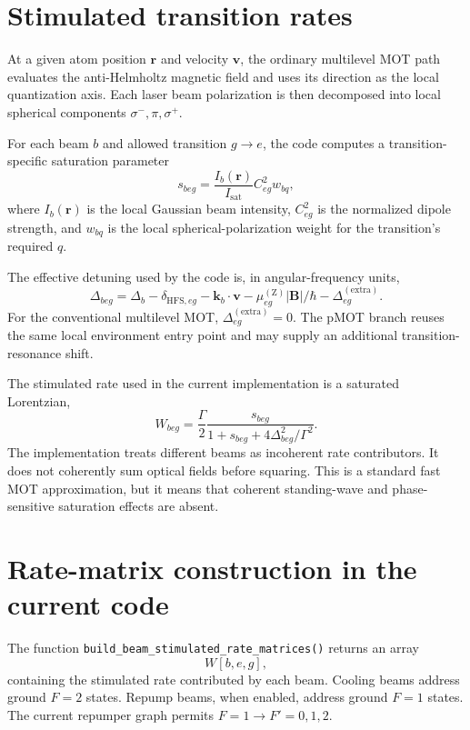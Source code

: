 \documentclass[11pt]{article}
\begin{document}
\section{Stimulated transition rates}

At a given atom position \(\mathbf r\) and velocity \(\mathbf v\), the ordinary
multilevel MOT path evaluates the anti-Helmholtz magnetic field and uses its
direction as the local quantization axis.  Each laser beam polarization is then
decomposed into local spherical components \(\sigma^{-},\pi,\sigma^{+}\).

For each beam \(b\) and allowed transition \(g\rightarrow e\), the code computes
a transition-specific saturation parameter
\[
    s_{b e g}
    =
    \frac{I_b(\mathbf r)}{I_{\mathrm{sat}}}
    C_{eg}^{2}
    w_{bq},
\]
where \(I_b(\mathbf r)\) is the local Gaussian beam intensity,
\(C_{eg}^{2}\) is the normalized dipole strength, and \(w_{bq}\) is the local
spherical-polarization weight for the transition's required \(q\).

The effective detuning used by the code is, in angular-frequency units,
\[
    \Delta_{b e g}
    =
    \Delta_b
    - \delta_{\mathrm{HFS},eg}
    - \mathbf k_b\cdot\mathbf v
    - \mu_{eg}^{(\mathrm{Z})} |\mathbf B|/\hbar
    - \Delta^{(\mathrm{extra})}_{eg}.
\]
For the conventional multilevel MOT,
\(\Delta^{(\mathrm{extra})}_{eg}=0\).  The pMOT branch reuses the same local
environment entry point and may supply an additional transition-resonance shift.

The stimulated rate used in the current implementation is a saturated Lorentzian,
\[
    W_{b e g}
    =
    \frac{\Gamma}{2}
    \frac{s_{b e g}}
    {1+s_{b e g}+4\Delta_{b e g}^{2}/\Gamma^{2}}.
\]
The implementation treats different beams as incoherent rate contributors.  It
does not coherently sum optical fields before squaring.  This is a standard
fast MOT approximation, but it means that coherent standing-wave and
phase-sensitive saturation effects are absent.

\section{Rate-matrix construction in the current code}

The function \texttt{build\_beam\_stimulated\_rate\_matrices()} returns an array
\[
    W[b,e,g],
\]
containing the stimulated rate contributed by each beam.  Cooling beams address
ground \(F=2\) states.  Repump beams, when enabled, address ground \(F=1\)
states.  The current repumper graph permits \(F=1\rightarrow F'=0,1,2\).
\end{document}
